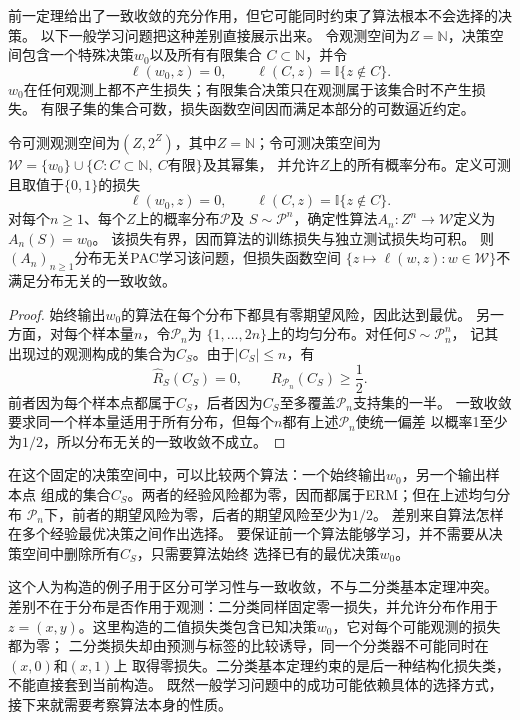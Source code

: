 前一定理给出了一致收敛的充分作用，但它可能同时约束了算法根本不会选择的决策。
以下一般学习问题把这种差别直接展示出来。
令观测空间为$Z=\mathbb N$，决策空间包含一个特殊决策$w_0$以及所有有限集合
$C\subset\mathbb N$，并令
\[
 \ell(w_0,z)=0,\qquad \ell(C,z)=\mathbb I\{z\notin C\}.
\]
$w_0$在任何观测上都不产生损失；有限集合决策只在观测属于该集合时不产生损失。
有限子集的集合可数，损失函数空间因而满足本部分的可数逼近约定。

\begin{theorem}[可学习性不推出一致收敛]
\label{thm:general-learning-without-uniform}
令可测观测空间为$(Z,2^Z)$，其中$Z=\mathbb N$；令可测决策空间为
$\mathcal W=\{w_0\}\cup\{C:C\subset\mathbb N,\ C\text{有限}\}$及其幂集，
并允许$Z$上的所有概率分布。定义可测且取值于$\{0,1\}$的损失
\[
 \ell(w_0,z)=0,\qquad
 \ell(C,z)=\mathbb I\{z\notin C\}.
\]
对每个$n\geq1$、每个$Z$上的概率分布$\mathcal P$及
$S\sim\mathcal P^n$，确定性算法$A_n:Z^n\to\mathcal W$定义为$A_n(S)=w_0$。
该损失有界，因而算法的训练损失与独立测试损失均可积。
则$(A_n)_{n\geq1}$分布无关PAC学习该问题，但损失函数空间
$\{z\mapsto\ell(w,z):w\in\mathcal W\}$不满足分布无关的一致收敛。
\end{theorem}
\begin{proof}
始终输出$w_0$的算法在每个分布下都具有零期望风险，因此达到最优。
另一方面，对每个样本量$n$，令$\mathcal P_n$为
$\{1,\ldots,2n\}$上的均匀分布。对任何$S\sim\mathcal P_n^n$，
记其出现过的观测构成的集合为$C_S$。由于$|C_S|\leq n$，有
\[
 \hat R_S(C_S)=0,\qquad R_{\mathcal P_n}(C_S)\geq\frac12.
\]
前者因为每个样本点都属于$C_S$，后者因为$C_S$至多覆盖$\mathcal P_n$支持集的一半。
一致收敛要求同一个样本量适用于所有分布，但每个$n$都有上述$\mathcal P_n$使统一偏差
以概率1至少为$1/2$，所以分布无关的一致收敛不成立。
\end{proof}

在这个固定的决策空间中，可以比较两个算法：一个始终输出$w_0$，另一个输出样本点
组成的集合$C_S$。两者的经验风险都为零，因而都属于ERM；但在上述均匀分布
$\mathcal P_n$下，前者的期望风险为零，后者的期望风险至少为$1/2$。
差别来自算法怎样在多个经验最优决策之间作出选择。
要保证前一个算法能够学习，并不需要从决策空间中删除所有$C_S$，只需要算法始终
选择已有的最优决策$w_0$。

这个人为构造的例子用于区分可学习性与一致收敛，不与二分类基本定理冲突。
差别不在于分布是否作用于观测：二分类同样固定零一损失，并允许分布作用于
$z=(x,y)$。这里构造的二值损失类包含已知决策$w_0$，它对每个可能观测的损失都为零；
二分类损失却由预测与标签的比较诱导，同一个分类器不可能同时在$(x,0)$和$(x,1)$上
取得零损失。二分类基本定理约束的是后一种结构化损失类，不能直接套到当前构造。
既然一般学习问题中的成功可能依赖具体的选择方式，接下来就需要考察算法本身的性质。

